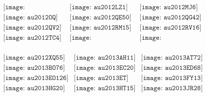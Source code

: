 \documentclass{article}
\begin{document}
\begin{figure}[H]
 \begin{center}$
 \begin{array}{cccc}
\texttt{[image: au2012KT42]}&\texttt{[image: au2012LZ1]}&\texttt{[image: au2012MJ6]}\\\texttt{[image: au2012OQ]}&\texttt{[image: au2012QE50]}&\texttt{[image: au2012QG42]}\\\texttt{[image: au2012QV2]}&\texttt{[image: au2012RM15]}&\texttt{[image: au2012RV16]}\\\texttt{[image: au2012TC4]}&\texttt{[image: au2012XH112]}&\texttt{[image: au2012XJ134]}\\
\end{array}$
\end{center}
\end{figure}

\begin{figure}[H]
 \begin{center}$
 \begin{array}{cccc}
\texttt{[image: au2012XQ55]}&\texttt{[image: au2013AH11]}&\texttt{[image: au2013AT72]}\\\texttt{[image: au2013BO76]}&\texttt{[image: au2013EC20]}&\texttt{[image: au2013ED68]}\\\texttt{[image: au2013EO126]}&\texttt{[image: au2013ET]}&\texttt{[image: au2013FY13]}\\\texttt{[image: au2013HG20]}&\texttt{[image: au2013HT15]}&\texttt{[image: au2013JR28]}\\
\end{array}$
\end{center}
\end{figure}
\end{document}
